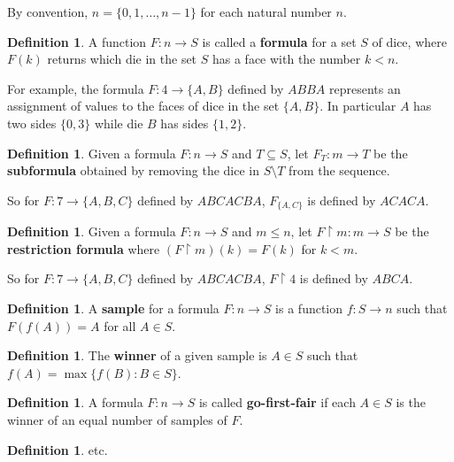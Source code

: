 \documentclass{article}
\theoremstyle{definition}
\newtheorem{definition}[theorem]{Definition}
\newcommand{\rest}{\upharpoonright}
\newcommand{\term}{\textbf}
\begin{document}
By convention, \(n=\{0,1,\dots,n-1\}\) for each natural number \(n\).

\begin{definition}
    A function \(F:n\to S\) is called a \term{formula} for a 
    set \(S\) of dice, where \(F(k)\) returns which die in the set \(S\)
    has a face with the number \(k<n\).
\end{definition}

For example, the formula \(F:4\to\{A,B\}\) defined by \(ABBA\)
represents an assignment of values to the faces of dice in the set \(\{A,B\}\).
In particular \(A\) has two sides \(\{0,3\}\) while die \(B\) has sides \(\{1,2\}\).

\begin{definition}
    Given a formula \(F:n\to S\) and \(T\subseteq S\), let \(F_T:m\to T\) be the 
    \term{subformula} obtained by removing the dice in \(S\setminus T\) from the sequence.
\end{definition}

So for \(F:7\to\{A,B,C\}\) defined by \(ABCACBA\), \(F_{\{A,C\}}\) is defined by
\(ACACA\).

\begin{definition}
    Given a formula \(F:n\to S\) and \(m\leq n\), let \(F\rest m:m\to S\) be the 
    \term{restriction formula} where \((F\rest m)(k)=F(k)\) for \(k<m\).
\end{definition}

So for \(F:7\to\{A,B,C\}\) defined by \(ABCACBA\), \(F\rest 4\) is defined by
\(ABCA\).

\begin{definition}
    A \term{sample} for a formula \(F:n\to S\) is a function \(f:S\to n\) such
    that \(F(f(A))=A\) for all \(A\in S\).
\end{definition}

\begin{definition}
    The \term{winner} of a given sample is \(A\in S\) such that
    \(f(A)=\max\{f(B):B\in S\}\).
\end{definition}

\begin{definition}
    A formula \(F:n\to S\) is called \term{go-first-fair} if each \(A\in S\)
    is the winner of an equal number of samples of \(F\).
\end{definition}

\begin{definition}etc.\end{definition}
\end{document}
